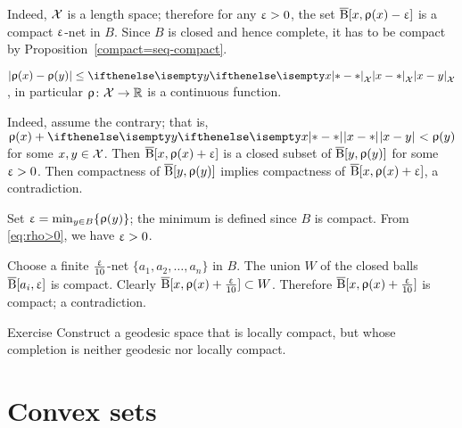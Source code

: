 Indeed, $\mathcal{X}$ is a length space;
therefore for any $\upvarepsilon>0$, 
the set $\overline{\mathrm{B}}{}[x,\upvarrho(x)-\upvarepsilon]$ is a compact $\upvarepsilon$-net in $B$.
Since $B$ is closed and hence complete, it has to be compact by Proposition~\ref{compact=seq-compact}.
\claimqeds

\begin{clm}{} $|\rho(x)-\rho(y)|\le \dist{x}{y}{\spc{X}}$,
in particular $\rho\:\spc{X}\to\RR$ is a continuous function.
\end{clm}

Indeed, assume the contrary; that is, $\rho(x)+\dist{x}{y}{}<\rho(y)$ for some $x,y\in \spc{X}$. 
Then 
$\overline{\mathrm{B}}{}[x,\upvarrho(x)+\upvarepsilon]$ is a closed subset of $\overline{\mathrm{B}}{}[y,\upvarrho(y)]$ for some $\upvarepsilon>0$.
Then  compactness of $\overline{\mathrm{B}}{}[y,\upvarrho(y)]$ implies compactness of $\overline{\mathrm{B}}{}[x,\upvarrho(x)+\upvarepsilon]$, a contradiction.\claimqeds

Set $\eps=\min_{y\in B}\{\rho(y)\}$; 
the minimum is defined since $B$ is compact.
From \ref{eq:rho>0}, we have $\upvarepsilon>0$.

Choose a finite $\tfrac{\upvarepsilon}{10}$-net $\{a_1,a_2,\dots,a_n\}$ in $B$.
The union $W$ of the closed balls $\overline{\mathrm{B}}{}[a_i,\upvarepsilon]$ is compact.
Clearly 
$\cBall[x,\rho(x)+\frac\eps{10}]\subset W$.
Therefore $\overline{\mathrm{B}}{}[x,\upvarrho(x)+\frac{\upvarepsilon}{10}]$ is compact;
a contradiction.
\qeds

\begin{thm}{Exercise}\label{exercise from BH}
Construct a geodesic space that is locally compact,
but whose completion is neither geodesic nor locally compact.
\end{thm}

\section{Convex sets}



